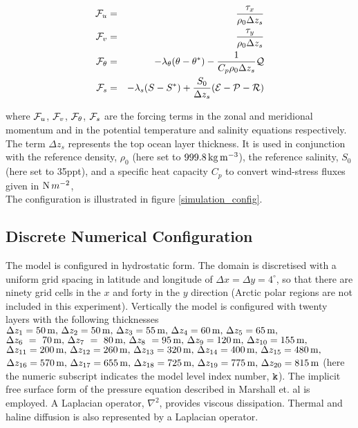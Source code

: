 \begin{eqnarray}
\label{EQ:global_forcing}
\label{EQ:global_forcing_fu}
{\cal F}_{u} & = & \frac{\tau_{x}}{\rho_{0} \Delta z_{s}}
\\
\label{EQ:global_forcing_fv}
{\cal F}_{v} & = & \frac{\tau_{y}}{\rho_{0} \Delta z_{s}}
\\
\label{EQ:global_forcing_ft}
{\cal F}_{\theta} & = & - \lambda_{\theta} ( \theta - \theta^{\ast} ) 
 - \frac{1}{C_{p} \rho_{0} \Delta z_{s}}{\cal Q}
\\
\label{EQ:global_forcing_fs}
{\cal F}_{s} & = & - \lambda_{s} ( S - S^{\ast} ) 
 + \frac{S_{0}}{\Delta z_{s}}({\cal E} - {\cal P} - {\cal R})
\end{eqnarray}

\noindent where ${\cal F}_{u}$, ${\cal F}_{v}$, ${\cal F}_{\theta}$,
${\cal F}_{s}$ are the forcing terms in the zonal and meridional
momentum and in the potential temperature and salinity 
equations respectively.
The term $\Delta z_{s}$ represents the top ocean layer thickness.
It is used in conjunction with the reference density, $\rho_{0}$
(here set to $999.8\,{\rm kg\,m^{-3}}$), the
reference salinity, $S_{0}$ (here set to 35ppt),
and a specific heat capacity $C_{p}$ to convert
wind-stress fluxes given in ${\rm N}\,m^{-2}$, 
\\


The configuration is illustrated in figure \ref{simulation_config}.


\subsection{Discrete Numerical Configuration}


 The model is configured in hydrostatic form.  The domain is discretised with 
a uniform grid spacing in latitude and longitude of
 $\Delta x=\Delta y=4^{\circ}$, so 
that there are ninety grid cells in the $x$ and forty in the 
$y$ direction (Arctic polar regions are not
included in this experiment). Vertically the 
model is configured with twenty layers with the following thicknesses
$\Delta z_{1} = 50\,{\rm m},\,
 \Delta z_{2} = 50\,{\rm m},\,
 \Delta z_{3} = 55\,{\rm m},\,
 \Delta z_{4} = 60\,{\rm m},\,
 \Delta z_{5} = 65\,{\rm m},\,
$
$
 \Delta z_{6}~=~70\,{\rm m},\,
 \Delta z_{7}~=~80\,{\rm m},\,
 \Delta z_{8}~=95\,{\rm m},\,
 \Delta z_{9}=120\,{\rm m},\,
 \Delta z_{10}=155\,{\rm m},\,
$
$
 \Delta z_{11}=200\,{\rm m},\,
 \Delta z_{12}=260\,{\rm m},\,
 \Delta z_{13}=320\,{\rm m},\,
 \Delta z_{14}=400\,{\rm m},\,
 \Delta z_{15}=480\,{\rm m},\,
$
$
 \Delta z_{16}=570\,{\rm m},\,
 \Delta z_{17}=655\,{\rm m},\,
 \Delta z_{18}=725\,{\rm m},\,
 \Delta z_{19}=775\,{\rm m},\,
 \Delta z_{20}=815\,{\rm m}
$ (here the numeric subscript indicates the model level index number, ${\tt k}$).
The implicit free surface form of the pressure equation described in Marshall et. al 
\cite{Marshall97a} is employed. A Laplacian operator, $\nabla^2$, provides viscous
dissipation. Thermal and haline diffusion is also represented by a Laplacian operator.
\\

